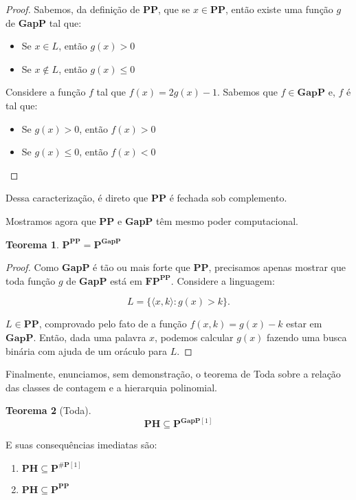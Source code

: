 \documentclass[paper=a4, fontsize=11pt]{scrartcl} %
\newtheorem{theorem}{Teorema}
\numberwithin{equation}{subsection}
\numberwithin{figure}{subsection}
\numberwithin{table}{subsection}
\numberwithin{definition}{subsection}
\numberwithin{theorem}{subsection}
\numberwithin{property}{subsection}
\numberwithin{proposition}{subsection}
\renewcommand{\P}{\textbf{P}\xspace}
\newcommand{\PH}{\textbf{PH}\xspace}
\newcommand{\SP}{\textbf{\#P}\xspace}
\newcommand{\FP}{\textbf{FP}\xspace}
\newcommand{\PP}{\textbf{PP}\xspace}
\newcommand{\gP}{\textbf{GapP}\xspace}
\begin{document}
\begin{proof}
Sabemos, da definição de \PP, que se $x \in \PP$, então existe uma função $g$ de \gP tal que:
\begin{itemize}
   \item Se $x \in L$, então $g(x) > 0$
   \item Se $x \not\in L$, então $g(x) \leq 0$
\end{itemize}
Considere a função $f$ tal que $f(x) = 2g(x) - 1$. Sabemos que $f \in \gP$ e, $f$ é tal que:
\begin{itemize}
   \item Se $g(x) > 0$, então $f(x) > 0$
   \item Se $g(x) \leq 0$, então $f(x) < 0$
\end{itemize}
\end{proof}

Dessa caracterização, é direto que \PP é fechada sob complemento.


Mostramos agora que \PP e \gP têm mesmo poder computacional.
\begin{theorem}
$\P^\PP = \P^\gP$
\end{theorem}
\begin{proof}
Como \gP é tão ou mais forte que \PP, precisamos apenas mostrar que toda função $g$ de \gP está em $\FP^\PP$. Considere a linguagem:

$$
L = \{ \langle x, k \rangle : g(x) > k \}.
$$

$L \in \PP$, comprovado pelo fato de a função $f(x, k) = g(x) - k$ estar em $\gP$. Então, dada uma palavra $x$, podemos calcular $g(x)$ fazendo uma busca binária com ajuda de um oráculo para $L$.

\end{proof}

Finalmente, enunciamos, sem demonstração, o teorema de Toda sobre a relação das classes de contagem e a hierarquia polinomial.

\begin{theorem} [Toda]
$$ \PH \subseteq \P^{\gP[1]} $$
\end{theorem}

E suas consequências imediatas são:
\begin{enumerate}
\item $ \PH \subseteq \P^{\SP[1]}$
\item $ \PH \subseteq \P^{\PP}$
\end{enumerate}
\end{document}
